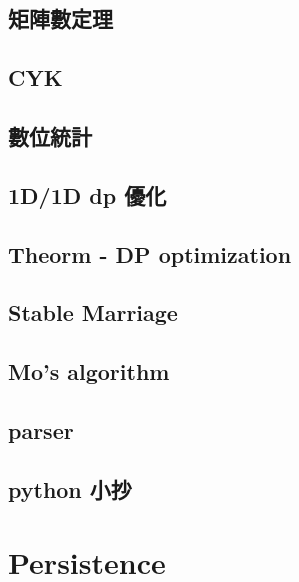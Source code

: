 \subsection{矩陣數定理}

\subsection{CYK}

\subsection{數位統計}

\subsection{1D/1D dp 優化}

\subsection{Theorm - DP optimization}

\subsection{Stable Marriage}

\subsection{Mo's algorithm}

\subsection{parser}

\subsection{python 小抄}



\section{Persistence}

